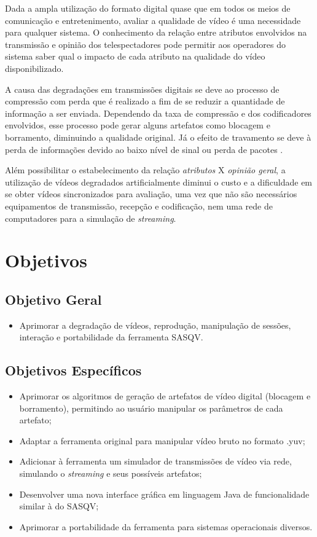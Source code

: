 Dada a ampla utilização do formato digital quase que em todos os meios de comunicação e entretenimento, avaliar a qualidade de vídeo é uma necessidade para qualquer sistema. O conhecimento da relação entre atributos envolvidos na transmissão e opinião dos telespectadores pode permitir aos operadores do sistema saber qual o impacto de cada atributo na qualidade do vídeo disponibilizado.

A causa das degradações em transmissões digitais se deve ao processo de compressão com perda que é realizado a fim de se reduzir a quantidade de informação a ser enviada. Dependendo da taxa de compressão e dos codificadores envolvidos, esse processo pode gerar alguns artefatos como blocagem e borramento, diminuindo a qualidade original. Já o efeito de travamento se deve à perda de informações devido ao baixo nível de sinal ou perda de pacotes \cite{albini}.

Além possibilitar o estabelecimento da relação \emph{atributos} X \emph{opinião geral}, a utilização de vídeos degradados artificialmente diminui o custo e a dificuldade em se obter vídeos sincronizados para avaliação, uma vez que não são necessários equipamentos de transmissão, recepção e codificação, nem uma rede de computadores para a simulação de \emph{streaming}.

\section{Objetivos}
\subsection{Objetivo Geral}

\begin{itemize}
    \item Aprimorar a degradação de vídeos, reprodução, manipulação de sessões, interação e portabilidade da ferramenta SASQV.
\end{itemize}

\subsection{Objetivos Específicos}

\begin{itemize}
    \item Aprimorar os algoritmos de geração de artefatos de vídeo digital (blocagem e borramento), permitindo ao usuário manipular os parâmetros de cada artefato;
    \item Adaptar a ferramenta original para manipular vídeo bruto no formato .yuv;
    \item Adicionar à ferramenta um simulador de transmissões de vídeo via rede, simulando o \emph{streaming} e seus possíveis artefatos;
    \item Desenvolver uma nova interface gráfica em linguagem Java de funcionalidade similar à do SASQV;
    \item Aprimorar a portabilidade da ferramenta para sistemas operacionais diversos.
\end{itemize}

